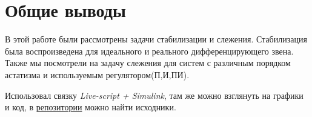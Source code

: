 \chapter{Общие выводы}
\label{ch:chap7}

В этой работе были рассмотрены задачи стабилизации и слежения. 
Стабилизация была воспроизведена для идеального и реального дифференцирующего звена. 
Также мы посмотрели на задачу слежения для систем с различным порядком астатизма и используемым регулятором(П,И,ПИ).

Использовал связку \textit{Live-script + Simulink}, там же можно взглянуть на графики и код, в \href{https://github.com/GreedlyCore/control_theory_course}{репозитории} можно найти исходники. 
\endinput